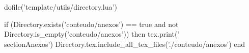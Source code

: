 \documentclass[12pt]{article}
\begin{document}
    
    

    \hypersetup{pageanchor=false}
    \setcounter{page}{1}
    
    
    
    
    \hypersetup{pageanchor=true}
    \setcounter{page}{3}
    
    
    \nocite{*}

    \keepXColumns
    
    
    \pagebreak
    \begin{luacode}
        dofile('template/utils/directory.lua')

        if (Directory.exists('conteudo/anexos') == true and not Directory.is_empty('conteudo/anexos')) then
            tex.print('\\section{Anexos}')
            Directory.tex.include_all_tex_files('./conteudo/anexos')
        end

    \end{luacode}
\end{document}
